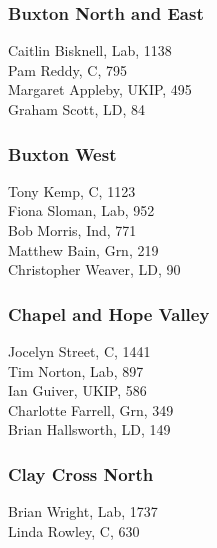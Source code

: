\documentclass[a4paper,openany,10pt]{book}
\begin{document}
\subsubsection*{Buxton North and East}



Caitlin Bisknell, Lab, 1138\\
Pam Reddy, C, 795\\
Margaret Appleby, UKIP, 495\\
Graham Scott, LD, 84\\


\subsubsection*{Buxton West}



Tony Kemp, C, 1123\\
Fiona Sloman, Lab, 952\\
Bob Morris, Ind, 771\\
Matthew Bain, Grn, 219\\
Christopher Weaver, LD, 90\\


\subsubsection*{Chapel and Hope Valley}



Jocelyn Street, C, 1441\\
Tim Norton, Lab, 897\\
Ian Guiver, UKIP, 586\\
Charlotte Farrell, Grn, 349\\
Brian Hallsworth, LD, 149\\


\subsubsection*{Clay Cross North}



Brian Wright, Lab, 1737\\
Linda Rowley, C, 630\\
\end{document}
